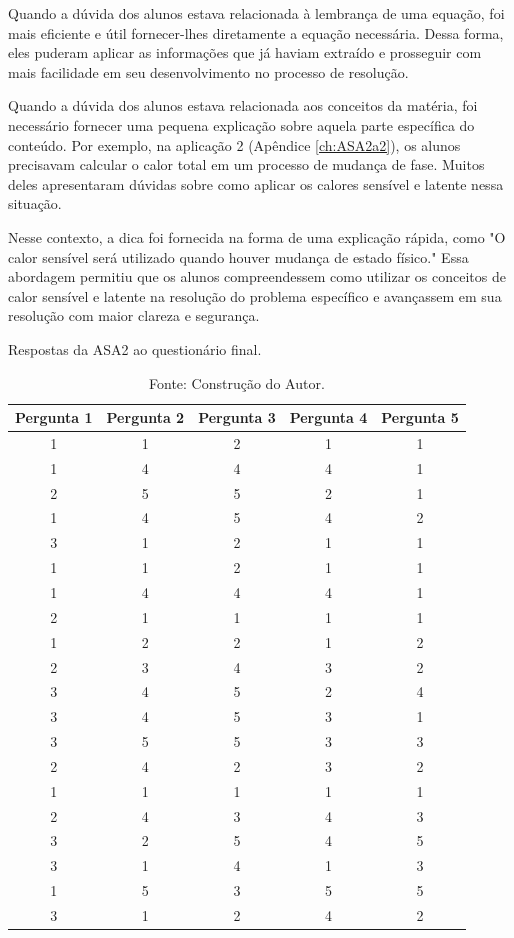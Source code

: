 Quando a dúvida dos alunos estava relacionada à lembrança de uma equação, foi mais eficiente e útil fornecer-lhes diretamente a equação necessária. Dessa forma, eles puderam aplicar as informações que já haviam extraído e prosseguir com mais facilidade em seu desenvolvimento no processo de resolução.

Quando a dúvida dos alunos estava relacionada aos conceitos da matéria, foi necessário fornecer uma pequena explicação sobre aquela parte específica do conteúdo. Por exemplo, na aplicação 2 (Apêndice \ref{ch:ASA2a2}), os alunos precisavam calcular o calor total em um processo de mudança de fase. Muitos deles apresentaram dúvidas sobre como aplicar os calores sensível e latente nessa situação.

Nesse contexto, a dica foi fornecida na forma de uma explicação rápida, como "O calor sensível será utilizado quando houver mudança de estado físico." Essa abordagem permitiu que os alunos compreendessem como utilizar os conceitos de calor sensível e latente na resolução do problema específico e avançassem em sua resolução com maior clareza e segurança.

\begin{table}[H]
    \centering
    \caption{Respostas da ASA2 ao questionário final.}\label{tab:questASA2}
    \begin{tabular}{ccccc}
    \hline
        \textbf{Pergunta 1} & \textbf{Pergunta 2} & \textbf{Pergunta 3} &\textbf{Pergunta 4} & \textbf{Pergunta 5} \\ \hline
        1 & 1 & 2 & 1 & 1 \\ 
        1 & 4 & 4 & 4 & 1 \\ 
        2 & 5 & 5 & 2 & 1 \\ 
        1 & 4 & 5 & 4 & 2 \\ 
        3 & 1 & 2 & 1 & 1 \\ 
        1 & 1 & 2 & 1 & 1 \\ 
        1 & 4 & 4 & 4 & 1 \\ 
        2 & 1 & 1 & 1 & 1 \\ 
        1 & 2 & 2 & 1 & 2 \\ 
        2 & 3 & 4 & 3 & 2 \\ 
        3 & 4 & 5 & 2 & 4 \\ 
        3 & 4 & 5 & 3 & 1 \\ 
        3 & 5 & 5 & 3 & 3 \\ 
        2 & 4 & 2 & 3 & 2 \\ 
        1 & 1 & 1 & 1 & 1 \\ 
        2 & 4 & 3 & 4 & 3 \\ 
        3 & 2 & 5 & 4 & 5 \\ 
        3 & 1 & 4 & 1 & 3 \\ 
        1 & 5 & 3 & 5 & 5 \\ 
        3 & 1 & 2 & 4 & 2 \\ \hline
    \end{tabular}
    \caption*{Fonte: Construção do Autor.}
\end{table}

